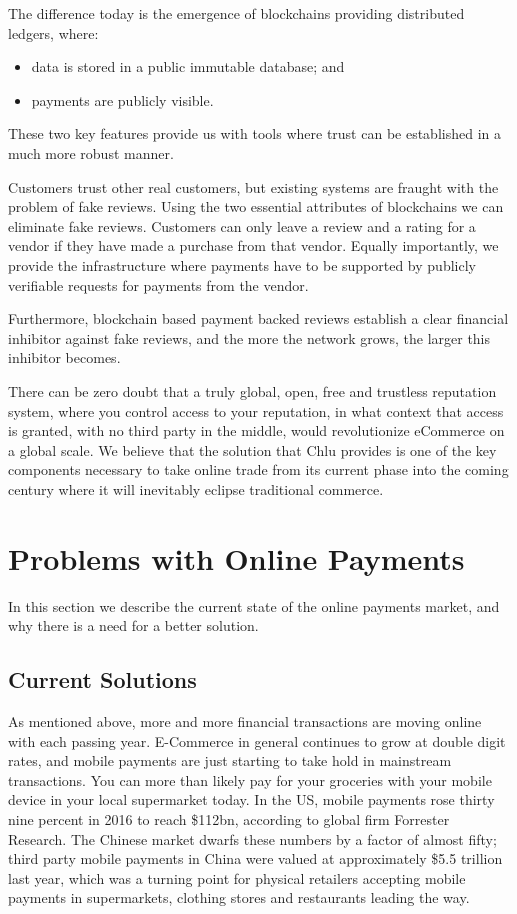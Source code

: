 \documentclass[a4paper]{article}
\begin{document}
The difference today is the emergence of blockchains providing
distributed ledgers, where:

\begin{itemize}
  \item data is stored in a public immutable database; and
  \item payments are publicly visible. 
\end{itemize}

These two key features provide us with tools where trust can be
established in a much more robust manner.

Customers trust other real customers, but existing systems are fraught
with the problem of fake reviews. Using the two essential attributes
of blockchains we can eliminate fake reviews. Customers can only leave
a review and a rating for a vendor if they have made a purchase from
that vendor. Equally importantly, we provide the infrastructure where
payments have to be supported by publicly verifiable requests for
payments from the vendor.

Furthermore, blockchain based payment backed reviews establish a clear
financial inhibitor against fake reviews, and the more the network
grows, the larger this inhibitor becomes.

There can be zero doubt that a truly global, open, free and trustless
reputation system, where you control access to your reputation, in
what context that access is granted, with no third party in the
middle, would revolutionize eCommerce on a global scale. We believe
that the solution that Chlu provides is one of the key components
necessary to take online trade from its current phase into the coming
century where it will inevitably eclipse traditional commerce.

\section{Problems with Online Payments}

In this section we describe the current state of the online payments
market, and why there is a need for a better solution.

\subsection{Current Solutions}

As mentioned above, more and more financial transactions are moving
online with each passing year. E-Commerce in general continues to grow
at double digit rates, and mobile payments are just starting to take
hold in mainstream transactions. You can more than likely pay for your
groceries with your mobile device in your local supermarket today. In
the US, mobile payments rose thirty nine percent in 2016 to reach
\$112bn, according to global firm Forrester Research. The Chinese
market dwarfs these numbers by a factor of almost fifty; third party
mobile payments in China were valued at approximately \$5.5 trillion
last year, which was a turning point for physical retailers accepting
mobile payments in supermarkets, clothing stores and restaurants
leading the way.
\end{document}
